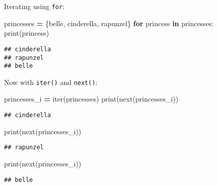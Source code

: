 \documentclass[
]{book}
\newenvironment{Shaded}{\begin{snugshade}}{\end{snugshade}}
\newcommand{\BuiltInTok}[1]{#1}
\newcommand{\ControlFlowTok}[1]{\textcolor[rgb]{0.13,0.29,0.53}{\textbf{#1}}}
\newcommand{\KeywordTok}[1]{\textcolor[rgb]{0.13,0.29,0.53}{\textbf{#1}}}
\newcommand{\NormalTok}[1]{#1}
\newcommand{\OperatorTok}[1]{\textcolor[rgb]{0.81,0.36,0.00}{\textbf{#1}}}
\newcommand{\StringTok}[1]{\textcolor[rgb]{0.31,0.60,0.02}{#1}}
\begin{document}
Iterating using \texttt{for}:

\begin{Shaded}
\begin{Highlighting}[]
\NormalTok{princesses }\OperatorTok{=}\NormalTok{ \{}\StringTok{\textquotesingle{}belle\textquotesingle{}}\NormalTok{, }\StringTok{\textquotesingle{}cinderella\textquotesingle{}}\NormalTok{, }\StringTok{\textquotesingle{}rapunzel\textquotesingle{}}\NormalTok{\}}
\ControlFlowTok{for}\NormalTok{ princess }\KeywordTok{in}\NormalTok{ princesses:}
    \BuiltInTok{print}\NormalTok{(princess)}
\end{Highlighting}
\end{Shaded}

\begin{verbatim}
## cinderella
## rapunzel
## belle
\end{verbatim}

Now with \texttt{iter()} and \texttt{next()}:

\begin{Shaded}
\begin{Highlighting}[]
\NormalTok{princesses\_i }\OperatorTok{=} \BuiltInTok{iter}\NormalTok{(princesses)}
\BuiltInTok{print}\NormalTok{(}\BuiltInTok{next}\NormalTok{(princesses\_i))}
\end{Highlighting}
\end{Shaded}

\begin{verbatim}
## cinderella
\end{verbatim}

\begin{Shaded}
\begin{Highlighting}[]
\BuiltInTok{print}\NormalTok{(}\BuiltInTok{next}\NormalTok{(princesses\_i))}
\end{Highlighting}
\end{Shaded}

\begin{verbatim}
## rapunzel
\end{verbatim}

\begin{Shaded}
\begin{Highlighting}[]
\BuiltInTok{print}\NormalTok{(}\BuiltInTok{next}\NormalTok{(princesses\_i))}
\end{Highlighting}
\end{Shaded}

\begin{verbatim}
## belle
\end{verbatim}
\end{document}
